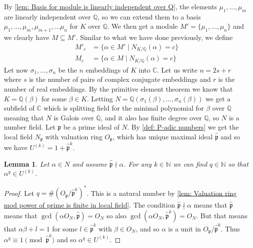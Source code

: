 \documentclass{article}
\newtheorem{lemma}{Lemma}[section]
\newcommand{\mfrak}[1]{\mathfrak{#1}}
\newcommand{\mbb}[1]{\mathbb{#1}}
\numberwithin{equation}{section}
\begin{document}
By \cref{lem: Basis for module is linearly independent over Q}, the elements $\mu_1, ..., \mu_m$ are linearly independent over $\mbb Q$, so we can extend them to a basis $\mu_1, ...,\mu_{m}, \mu_{m+1}, ... \mu_n$ for $K$ over $\mbb Q$. We then get a module $M' = \{ \mu_1, ..., \mu_n\}$ and we clearly have $M \subseteq M'$. Similar to what we have done previously, we define
\begin{align*}
    M'_c & = \{\alpha \in M' \mid N_{K / \mbb Q}(\alpha) = c \} \\
    M_c  & = \{\alpha \in M \mid N_{K / \mbb Q}(\alpha) = c \}
\end{align*}
Let now $\sigma_1, ..., \sigma_n$ be the $n$ embeddings of $K$ into $\mbb C$. Let us write $n = 2s + r$ where $s$ is the number of pairs of complex conjugate embeddings and $r$ is the number of real embeddings. By the primitive element theorem we know that $K = \mbb Q(\beta)$ for some $\beta \in K$. Letting $N = \mbb Q(\sigma_1(\beta), ..., \sigma_n(\beta))$ we get a subfield of $\mbb C$ which is splitting field for the minimal polynomial for $\beta$ over $\mbb Q$ meaning that $N$ is Galois over $\mbb Q$, and it also has finite degree over $\mbb Q$, so $N$ is a number field. Let $\mfrak p$ be a prime ideal of $N$. By \cref{def: P-adic numbers} we get the local field $N_{\mfrak p}$ with valuation ring $O_{\mfrak p}$, which has unique maximal ideal $\hat {\mfrak p}$ and so we have $U^{(k)} = 1 + \hat {\mfrak p}^k$.

\begin{lemma}\label{lem: Elements can be mapped to U^(k)}
    Let $\alpha \in N$ and assume $\hat {\mfrak p} \nmid \alpha$. For any $k \in \mbb N$ we can find $q \in \mbb N$ so that $\alpha^q \in U^{(k)}$.
\end{lemma}

\begin{proof}
    Let $q = \# (O_\mfrak p / \hat {\mfrak p}^k)^*$. This is a natural number by \cref{lem: Valuation ring mod power of prime is finite in local field}. The condition $\hat{\mfrak p}\nmid \alpha$ means that $\hat {\mfrak p}$ means that $\gcd(\alpha O_N, \hat {\mfrak p}) = O_N$ so also $\gcd(\alpha O_N, \hat {\mfrak p}^k) = O_N$. But that means that $\alpha \beta + l = 1$ for some $l \in {\hat {\mfrak p}}^k$ with $\beta \in O_N$, and so $\alpha$ is a unit in $O_\mfrak p / \hat {\mfrak p}^k$. Thus $\alpha^q \equiv 1 \pmod {\hat{\mfrak p}^k}$ and so $\alpha^q \in U^{(k)}$.
\end{proof}
\end{document}
